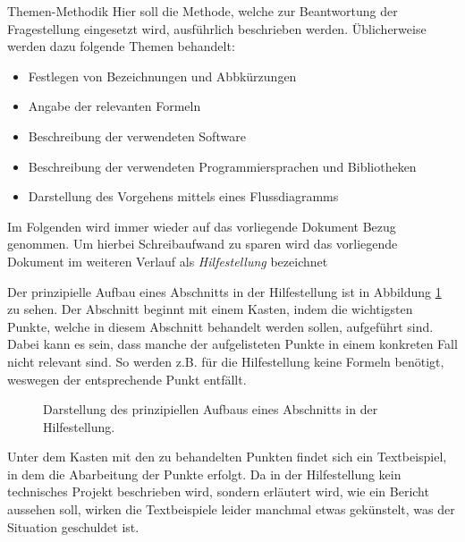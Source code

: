 %
\begin{simplebox}{Themen-Methodik}
%
Hier soll die Methode, welche zur Beantwortung der Fragestellung eingesetzt wird, ausführlich beschrieben werden.
Üblicherweise werden dazu folgende Themen behandelt:
%
\begin{itemize}
\item Festlegen von Bezeichnungen und Abbkürzungen 
\item Angabe der relevanten Formeln 
\item Beschreibung der verwendeten Software 
\item Beschreibung der verwendeten Programmiersprachen und Bibliotheken
\item Darstellung des Vorgehens mittels eines Flussdiagramms 
\end{itemize}
%
\end{simplebox}
%
Im Folgenden wird immer wieder auf das vorliegende Dokument Bezug genommen. 
Um hierbei Schreibaufwand zu sparen wird das vorliegende Dokument im weiteren Verlauf als \textit{Hilfestellung} bezeichnet
\par
Der prinzipielle Aufbau eines Abschnitts in der Hilfestellung ist in Abbildung \ref{fig:seite} zu sehen.
Der Abschnitt beginnt mit einem Kasten, indem die wichtigsten Punkte, welche in diesem Abschnitt behandelt werden sollen, aufgeführt sind.
Dabei kann es sein, dass manche der aufgelisteten Punkte in einem konkreten Fall nicht relevant sind.
So werden z.B. für die Hilfestellung keine Formeln benötigt, weswegen der entsprechende Punkt entfällt. 
%
\begin{figure}[h!]
\caption{Darstellung des prinzipiellen Aufbaus eines Abschnitts in der Hilfestellung.}
\label{fig:seite}
\end{figure}
%
\par
Unter dem Kasten mit den zu behandelten Punkten findet sich ein Textbeispiel, in dem die Abarbeitung der Punkte erfolgt. 
Da in der Hilfestellung kein technisches Projekt beschrieben wird, sondern erläutert wird, wie ein Bericht aussehen soll, wirken die Textbeispiele leider manchmal etwas gekünstelt, was der Situation geschuldet ist. 
